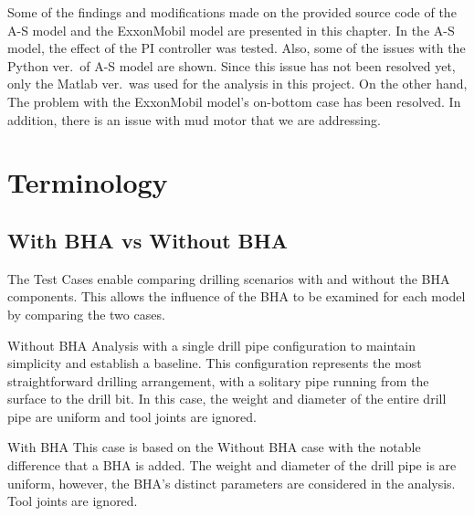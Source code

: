 Some of the findings and modifications made on the provided source code of the A-S model and the ExxonMobil model are presented in this chapter. In the A-S model, the effect of the PI controller was tested. Also, some of the issues with the Python ver.\ of A-S model are shown. Since this issue has not been resolved yet, only the Matlab ver.\ was used for the analysis in this project. On the other hand, The problem with the ExxonMobil model's on-bottom case has been resolved. In addition, there is an issue with mud motor that we are addressing. 

\section{Terminology}
\subsection{With BHA vs Without BHA}
The Test Cases enable comparing drilling scenarios with and without the BHA components. This allows the influence of the BHA to be examined for each model by comparing the two cases.

\begin{definition}{Without BHA}
Analysis with a single drill pipe configuration to maintain simplicity and establish a baseline. This configuration represents the most straightforward drilling arrangement, with a solitary pipe running from the surface to the drill bit. In this case, the weight and diameter of the entire drill pipe are uniform and tool joints are ignored.
\end{definition}
\begin{definition}{With BHA}
This case is based on the Without BHA case with the notable difference that a BHA is added.  The weight and diameter of the drill pipe is are uniform, however, the BHA's distinct parameters are considered in the analysis.  Tool joints are ignored.
\end{definition}


